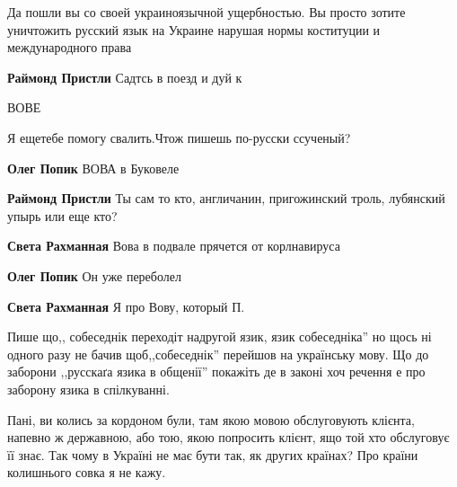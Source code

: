 \begin{itemize}

Да пошли вы со своей украиноязычной ущербностью. Вы просто зотите уничтожить
русский язык на Украине нарушая нормы коституции и международного права

\begin{itemize}
\textbf{Раймонд Пристли} Садтсь в поезд и дуй к

ВОВЕ

Я ещетебе помогу свалить.Чтож пишешь по-русски ссученый?

\textbf{Олег Попик}
ВОВА в Буковеле

\textbf{Раймонд Пристли} Ты сам то кто, англичанин, пригожинский троль, лубянский упырь или еще кто?

\textbf{Света Рахманная} Вова в подвале прячется от корлнавируса

\textbf{Олег Попик}
Он уже переболел

\textbf{Света Рахманная} Я про Вову, который П.
\end{itemize}


Пише що,, собеседнік переходіт надругой язик, язик собеседніка'' но щось ні
одного разу не бачив щоб,,собеседнік'' перейшов на українську мову. Що до
заборони ,,русскаґа язика в общенії'' покажіть де в законі хоч речення е про
заборону язика в спілкуванні.


Пані, ви колись за кордоном були, там якою мовою обслуговують клієнта, напевно
ж державною, або тою, якою попросить клієнт, ящо той хто обслуговує її знає.
Так чому в Україні не має бути так, як других країнах? Про країни колишнього
совка я не кажу.


\end{itemize}
